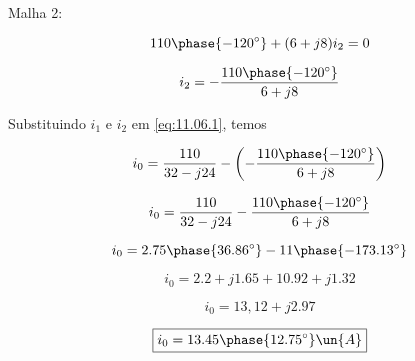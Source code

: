 Malha 2:

\[ 110\phase{-120^{\circ}} + (6 +j8)i_2 = 0 \]

\[ i_2 = - \frac{110\phase{-120^{\circ}}}{6 +j8} \]

Substituindo $i_1$ e $i_2$ em \eqref{eq:11.06.1}, temos   

\[  i_0 =  \frac{110}{32 - j24} - \left(- \frac{110\phase{-120^{\circ}}}{6 +j8}\right)  \]

\[  i_0 =  \frac{110}{32 - j24} - \frac{110\phase{-120^{\circ}}}{6 +j8} \]

\[  i_0 =  2.75\phase{36.86^{\circ}} - 11\phase{-173.13^{\circ}}  \]

\[  i_0 =  2.2 + j1.65 +10.92 + j1.32  \]

\[  i_0 =  13,12 + j2.97 \]

\[ \boxed{i_0 = 13.45\phase{12.75^{\circ}} \un{A}} \]

